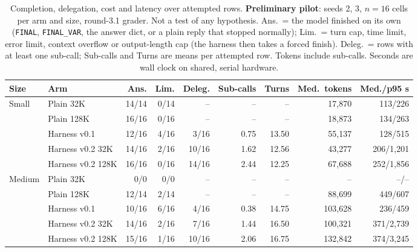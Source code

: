 \begin{table}[t]
\centering\small
\setlength{\tabcolsep}{4pt}
\caption{Completion, delegation, cost and latency over attempted rows. \textbf{Preliminary pilot}: seeds 2, 3, $n{=}16$ cells per arm and size, round-3.1 grader. Not a test of any hypothesis. Ans.\ = the model finished on its own (\texttt{FINAL}, \texttt{FINAL\_VAR}, the answer dict, or a plain reply that stopped normally); Lim.\ = turn cap, time limit, error limit, context overflow or output-length cap (the harness then takes a forced finish). Deleg.\ = rows with at least one sub-call; Sub-calls and Turns are means per attempted row. Tokens include sub-calls. Seconds are wall clock on shared, serial hardware.}
\label{tab:pilot-cost}
\begin{tabular}{llrrrrrrr}
\toprule
Size & Arm & Ans. & Lim. & Deleg. & Sub-calls & Turns & Med.\ tokens & Med./p95 s \\
\midrule
Small & Plain 32K & 14/14 & 0/14 & -- & -- & -- & 17{,}870 & 113/226 \\
 & Plain 128K & 16/16 & 0/16 & -- & -- & -- & 18{,}873 & 134/263 \\
 & Harness v0.1 & 12/16 & 4/16 & 3/16 & 0.75 & 13.50 & 55{,}137 & 128/515 \\
 & Harness v0.2 32K & 14/16 & 2/16 & 10/16 & 1.62 & 12.56 & 43{,}277 & 206/1{,}201 \\
 & Harness v0.2 128K & 16/16 & 0/16 & 14/16 & 2.44 & 12.25 & 67{,}688 & 252/1{,}856 \\
\midrule
Medium & Plain 32K & 0/0 & 0/0 & -- & -- & -- & -- & --/-- \\
 & Plain 128K & 12/14 & 2/14 & -- & -- & -- & 88{,}699 & 449/607 \\
 & Harness v0.1 & 10/16 & 6/16 & 4/16 & 0.38 & 14.75 & 103{,}628 & 236/459 \\
 & Harness v0.2 32K & 14/16 & 2/16 & 7/16 & 1.44 & 16.50 & 100{,}321 & 371/2{,}739 \\
 & Harness v0.2 128K & 15/16 & 1/16 & 10/16 & 2.06 & 16.75 & 132{,}842 & 374/3{,}245 \\
\bottomrule
\end{tabular}
\end{table}
